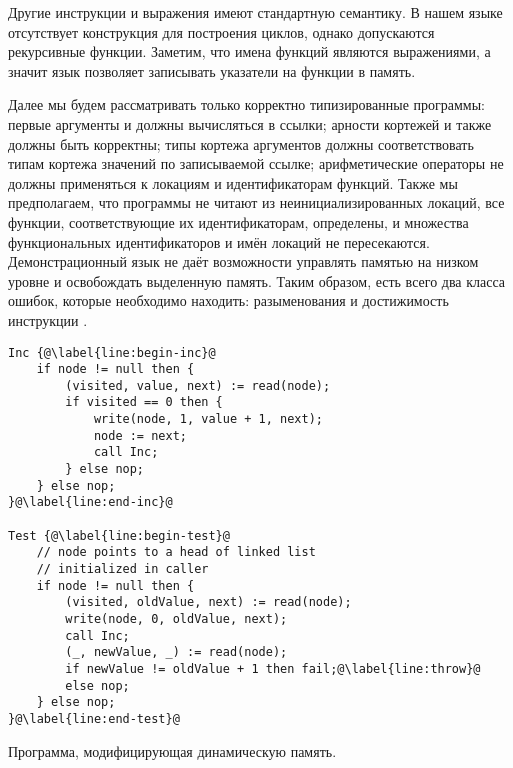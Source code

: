 
Другие инструкции и выражения имеют стандартную семантику. В нашем языке отсутствует конструкция для построения циклов, однако допускаются рекурсивные функции. Заметим, что имена функций являются выражениями, а значит язык позволяет записывать указатели на функции в память.

Далее мы будем рассматривать только корректно типизированные программы: первые аргументы \kwdread{} и \kwdwrite{} должны вычисляться в ссылки; арности кортежей \kwdread{} и \kwdwrite{} также должны быть корректны; типы кортежа аргументов \kwdwrite{} должны соответствовать типам кортежа значений по записываемой ссылке; арифметические операторы не должны применяться к локациям и идентификаторам функций. Также мы предполагаем, что программы не читают из неинициализированных локаций, все функции, соответствующие их идентификаторам, определены, и множества функциональных идентификаторов и имён локаций не пересекаются. Демонстрационный язык не даёт возможности управлять памятью на низком уровне и освобождать выделенную память. Таким образом, есть всего два класса ошибок, которые необходимо находить: разыменования  и достижимость инструкции \kwdfail{}.

\begin{listing}[h]
\begin{lstlisting}[style=demolang]
Inc {@\label{line:begin-inc}@
	if node != null then {
		(visited, value, next) := read(node);
		if visited == 0 then {
			write(node, 1, value + 1, next);
			node := next;
			call Inc;
		} else nop;
	} else nop;
}@\label{line:end-inc}@

Test {@\label{line:begin-test}@
	// node points to a head of linked list
	// initialized in caller
	if node != null then {
		(visited, oldValue, next) := read(node);
		write(node, 0, oldValue, next);
		call Inc;
		(_, newValue, _) := read(node);
		if newValue != oldValue + 1 then fail;@\label{line:throw}@
		else nop;
	} else nop;
}@\label{line:end-test}@
\end{lstlisting}
\caption{Программа, модифицирующая динамическую память.}
\label{figure:prog}
\end{listing}


